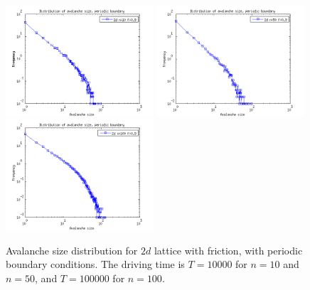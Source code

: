 \begin{figure} 
\begin{center}
\includegraphics[width=0.49\textwidth]{results/spf.png}
\includegraphics[width=0.49\textwidth]{results/spf50.png} \\
\includegraphics[width=0.49\textwidth]{results/spf100a.png}
\caption{Avalanche size distribution for $2d$ lattice with friction, with periodic boundary conditions. 
The driving time is $T=10000$ for $n=10$ and $n=50$, and $T=100000$ for $n=100$.}
\label{spf}
\end{center}
\end{figure} 



